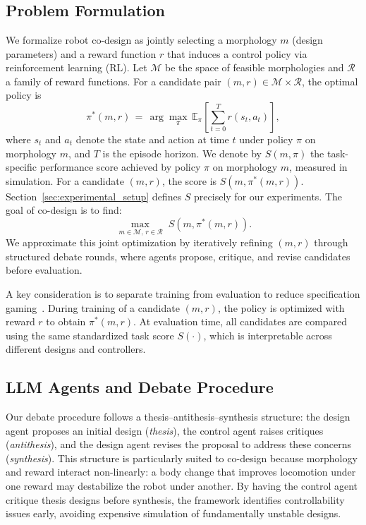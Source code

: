 \section{\method{}}
\label{sec:method}
\subsection{Problem Formulation}

We formalize robot co-design as jointly selecting a morphology $m$ (design parameters) and a reward function $r$ that induces a control policy via reinforcement learning (RL). Let $\mathcal{M}$ be the space of feasible morphologies and $\mathcal{R}$ a family of reward functions. For a candidate pair $(m, r) \in \mathcal{M}\times\mathcal{R}$, the optimal policy is
\begin{equation}
    \pi^\ast(m,r) \,=\, \arg\max_{\pi} \, \mathbb{E}_{\pi}\!\left[ \sum_{t=0}^{T} r(s_t, a_t) \right],
\end{equation}
where $s_t$ and $a_t$ denote the state and action at time $t$ under policy $\pi$ on morphology $m$, and $T$ is the episode horizon. We denote by $S(m,\pi)$ the task-specific performance score achieved by policy $\pi$ on morphology $m$, measured in simulation. For a candidate $(m,r)$, the score is $S(m,\pi^\ast(m,r))$. Section~\ref{sec:experimental_setup} defines $S$ precisely for our experiments. The goal of co-design is to find:
\begin{equation}
    \max_{\,m \in \mathcal{M},\, r \in \mathcal{R}} \; S(m,\pi^\ast(m,r)).
\end{equation}
We approximate this joint optimization by iteratively refining $(m, r)$ through structured debate rounds, where agents propose, critique, and revise candidates before evaluation.

A key consideration is to separate training from evaluation to reduce specification gaming~\cite{amodei2016concrete, krakovna2020specification}. During training of a candidate $(m,r)$, the policy is optimized with reward $r$ to obtain $\pi^\ast(m,r)$. At evaluation time, all candidates are compared using the same standardized task score $S(\cdot)$, which is interpretable across different designs and controllers.

\subsection{LLM Agents and Debate Procedure}
\label{sec:agents}

Our debate procedure follows a thesis--antithesis--synthesis structure: the design agent proposes an initial design (\emph{thesis}), the control agent raises critiques (\emph{antithesis}), and the design agent revises the proposal to address these concerns (\emph{synthesis}). This structure is particularly suited to co-design because morphology and reward interact non-linearly: a body change that improves locomotion under one reward may destabilize the robot under another. By having the control agent critique thesis designs before synthesis, the framework identifies controllability issues early, avoiding expensive simulation of fundamentally unstable designs.

